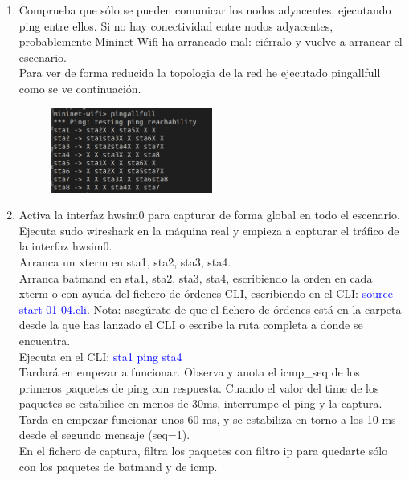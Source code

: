 \documentclass[12pt, a4paper]{report}
\begin{document}
\begin{enumerate}
	\item Comprueba que sólo se pueden comunicar los nodos adyacentes, ejecutando ping entre ellos.
	Si no hay conectividad entre nodos adyacentes, probablemente Mininet Wifi ha arrancado mal:
	ciérralo y vuelve a arrancar el escenario.\\
	
	Para ver de forma reducida la topologia de la red he ejecutado pingallfull como se ve  continuación.
	\begin{figure}[H]
		\centering
		\includegraphics[width=0.5\textwidth]{ej1.1}
	\end{figure}
	\item Activa la interfaz hwsim0 para capturar de forma global en todo el escenario. Ejecuta sudo wireshark
	en la máquina real y empieza a capturar el tráfico de la interfaz hwsim0.\\
	
	Arranca un xterm en sta1, sta2, sta3, sta4.\\
	Arranca batmand en sta1, sta2, sta3, sta4, escribiendo la orden en cada xterm o con ayuda
	del fichero de órdenes CLI, escribiendo en el CLI: \textcolor{blue}{source start-01-04.cli}. Nota: asegúrate de
	que el fichero de órdenes está en la carpeta desde la que has lanzado el CLI o escribe la ruta
	completa a donde se encuentra.\\
	
	Ejecuta en el CLI: \textcolor{blue}{sta1 ping sta4}\\
	
	Tardará en empezar a funcionar. Observa y anota el icmp\_seq de los primeros paquetes de
	ping con respuesta. Cuando el valor del time de los paquetes se estabilice en menos de 30ms,
	interrumpe el ping y la captura.\\
	
	Tarda en empezar funcionar unos 60 ms, y se estabiliza en torno a los 10 ms desde el segundo mensaje (seq=1).\\

	
	En el fichero de captura, filtra los paquetes con filtro ip para quedarte sólo con los paquetes de
	batmand y de icmp.\\
	

\end{enumerate}
\end{document}
